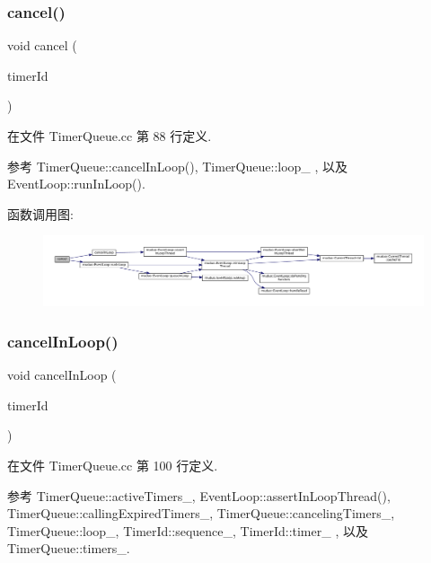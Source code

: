 \subsubsection{\texorpdfstring{cancel()}{cancel()}}
{\footnotesize\ttfamily void cancel (\begin{DoxyParamCaption}\item[{\hyperlink{classmuduo_1_1TimerId}{Timer\+Id}}]{timer\+Id }\end{DoxyParamCaption})}



在文件 Timer\+Queue.\+cc 第 88 行定义.



参考 Timer\+Queue\+::cancel\+In\+Loop(), Timer\+Queue\+::loop\+\_\+ , 以及 Event\+Loop\+::run\+In\+Loop().

函数调用图\+:
\nopagebreak
\begin{figure}[H]
\begin{center}
\leavevmode
\includegraphics[width=350pt]{classmuduo_1_1TimerQueue_af8b24b02bbff6a657fa5b0190bef9b9b_cgraph}
\end{center}
\end{figure}
\mbox{\label{classmuduo_1_1TimerQueue_abc59bed63190c00d9aab9281a543ea58}} 
\subsubsection{\texorpdfstring{cancel\+In\+Loop()}{cancelInLoop()}}
{\footnotesize\ttfamily void cancel\+In\+Loop (\begin{DoxyParamCaption}\item[{\hyperlink{classmuduo_1_1TimerId}{Timer\+Id}}]{timer\+Id }\end{DoxyParamCaption})\hspace{0.3cm}{\ttfamily [private]}}



在文件 Timer\+Queue.\+cc 第 100 行定义.



参考 Timer\+Queue\+::active\+Timers\+\_\+, Event\+Loop\+::assert\+In\+Loop\+Thread(), Timer\+Queue\+::calling\+Expired\+Timers\+\_\+, Timer\+Queue\+::canceling\+Timers\+\_\+, Timer\+Queue\+::loop\+\_\+, Timer\+Id\+::sequence\+\_\+, Timer\+Id\+::timer\+\_\+ , 以及 Timer\+Queue\+::timers\+\_\+.



